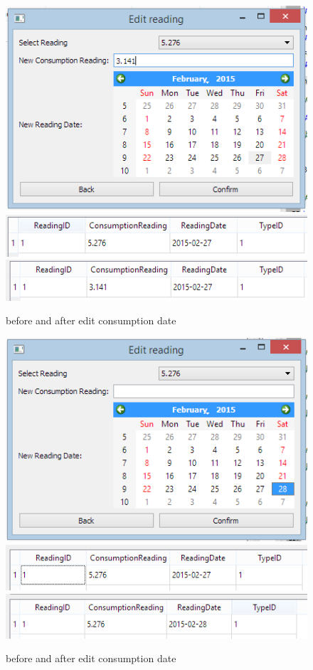 \begin{figure}[H]
	\includegraphics{./testing/images/test_2_3_edit_reading_consumption_data.png}
	\includegraphics{./testing/images/test_2_3_edit_reading_consumption_before.png}
	\includegraphics{./testing/images/test_2_3_edit_reading_consumption_data_changed.png}
	\caption{before and after edit consumption date} \label{fig:test_2.3_result}
\end{figure}

\begin{figure}[H]
	\includegraphics{./testing/images/test_2_4_edit_reading_date_data.png}
	\includegraphics{./testing/images/test_2_4_edit_reading_date_before.png}
	\includegraphics{./testing/images/test_2_4_edit_reading_date_data_changed.png}
	\caption{before and after edit consumption date} \label{fig:test_2.4_result}
\end{figure}

